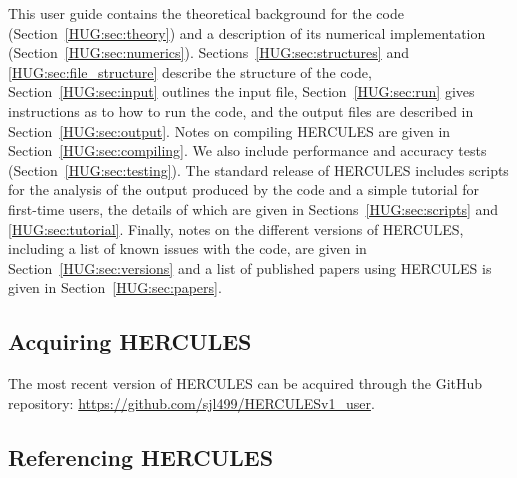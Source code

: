 \documentclass[11pt, oneside]{article}   	%
\begin{document}
This user guide contains the theoretical background for the code (Section~\ref{HUG:sec:theory}) and a description of its numerical implementation (Section~\ref{HUG:sec:numerics}). Sections~\ref{HUG:sec:structures} and \ref{HUG:sec:file_structure} describe the structure of the code, Section~\ref{HUG:sec:input} outlines the input file, Section~\ref{HUG:sec:run} gives instructions as to how to run the code, and the output files are described in Section~\ref{HUG:sec:output}.
Notes on compiling HERCULES are given in Section~\ref{HUG:sec:compiling}.
We also include performance and accuracy tests (Section~\ref{HUG:sec:testing}).
The standard release of HERCULES includes scripts for the analysis of the output produced by the code and a simple tutorial for first-time users, the details of which are given in Sections~\ref{HUG:sec:scripts} and \ref{HUG:sec:tutorial}.
Finally, notes on the different versions of HERCULES, including a list of known issues with the code, are given in Section~\ref{HUG:sec:versions} and a list of published papers using HERCULES is given in Section~\ref{HUG:sec:papers}.


\subsection{Acquiring HERCULES}
\label{HUG:sec:aquiring}

The most recent version of HERCULES can be acquired through the GitHub repository: \url{https://github.com/sjl499/HERCULESv1\_user}.

\subsection{Referencing HERCULES}
\end{document}
